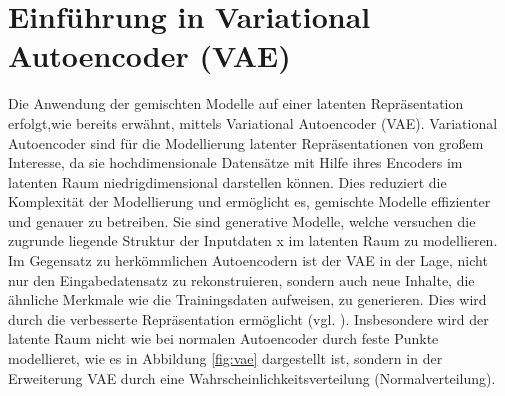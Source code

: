\documentclass[%
thesis=student,%
coverpage=false,%
titlepage=false,%
headmarks=true, %
german,%
font=libertine, %
math=newpxtx, %
BCOR=5mm,%
coverBCOR=11mm%
]{tumbook}
\theoremstyle{break}
\begin{document}


\section{Einführung in Variational Autoencoder (VAE)}
Die Anwendung der gemischten Modelle auf einer latenten Repräsentation erfolgt,wie bereits erwähnt, mittels Variational Autoencoder (VAE).
Variational Autoencoder sind für die Modellierung latenter Repräsentationen von großem Interesse, da sie hochdimensionale Datensätze mit Hilfe ihres Encoders im latenten Raum  niedrigdimensional darstellen können. Dies reduziert die Komplexität der Modellierung und ermöglicht es, gemischte Modelle effizienter und genauer zu betreiben. Sie sind generative Modelle, welche versuchen die zugrunde liegende Struktur der Inputdaten x im latenten Raum zu modellieren.\\
Im Gegensatz zu herkömmlichen Autoencodern ist der VAE in der Lage, nicht nur den Eingabedatensatz zu rekonstruieren, sondern auch neue Inhalte, die ähnliche Merkmale wie die Trainingsdaten aufweisen, zu generieren. Dies wird durch die verbesserte Repräsentation ermöglicht (vgl. \cite{bigdata-insider-vae}). Insbesondere wird der latente Raum nicht wie bei normalen Autoencoder durch feste Punkte modellieret, wie es in Abbildung \ref{fig:vae} dargestellt ist, sondern in der Erweiterung VAE durch eine Wahrscheinlichkeitsverteilung (Normalverteilung).
\end{document}
